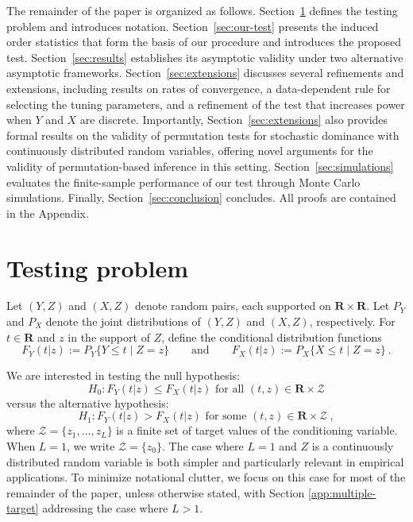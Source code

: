 \documentclass[11pt]{article}
\numberwithin{equation}{section}
\begin{document}
The remainder of the paper is organized as follows. Section~\ref{sec:testing-problem} defines the testing problem and introduces notation. Section~\ref{sec:our-test} presents the induced order statistics that form the basis of our procedure and introduces the proposed test. Section~\ref{sec:results} establishes its asymptotic validity under two alternative asymptotic frameworks. Section~\ref{sec:extensions} discusses several refinements and extensions, including results on rates of convergence, a data-dependent rule for selecting the tuning parameters, and a refinement of the test that increases power when $Y$ and $X$ are discrete. Importantly, Section~\ref{sec:extensions} also provides formal results on the validity of permutation tests for stochastic dominance with continuously distributed random variables, offering novel arguments for the validity of permutation-based inference in this setting. Section~\ref{sec:simulations} evaluates the finite-sample performance of our test through Monte Carlo simulations. Finally, Section~\ref{sec:conclusion} concludes. All proofs are contained in the Appendix. 

\section{Testing problem}\label{sec:testing-problem}
Let $(Y,Z)$ and $(X,Z)$ denote random pairs, each supported on $\mathbf{R}\times\mathbf{R}$. Let $P_Y$ and $P_X$ denote the joint distributions of $(Y,Z)$ and $(X,Z)$, respectively. For $t\in\mathbf{R}$ and $z$ in the support of $Z$, define the conditional distribution functions
\[
F_Y(t | z) := P_Y\{Y \le t \mid Z=z\}
\qquad\text{and}\qquad
F_X(t | z) := P_X\{X \le t \mid Z=z\}~.
\]

We are interested in testing the null hypothesis:
\begin{equation}\label{eq:H0}
  H_0: F_Y(t|z) \le F_X(t|z) \text{ for all } (t, z) \in \mathbf{R} \times \mathcal{Z}
\end{equation}
versus the alternative hypothesis:
\begin{equation*}\label{eq:H1}
  H_1: F_Y(t|z) > F_X(t|z) \text{ for some } (t, z) \in \mathbf{R} \times \mathcal{Z}~,
\end{equation*}
where $\mathcal{Z} = \{z_1, \dots, z_L\}$ is a finite set of target values of the conditioning variable. When $L=1$, we write $\mathcal Z=\{z_0\}$. The case where $L = 1$ and $Z$ is a continuously distributed random variable is both simpler and particularly relevant in empirical applications. To minimize notational clutter, we focus on this case for most of the remainder of the paper, unless otherwise stated, with Section \ref{app:multiple-target} addressing the case where $L > 1$.
\end{document}
